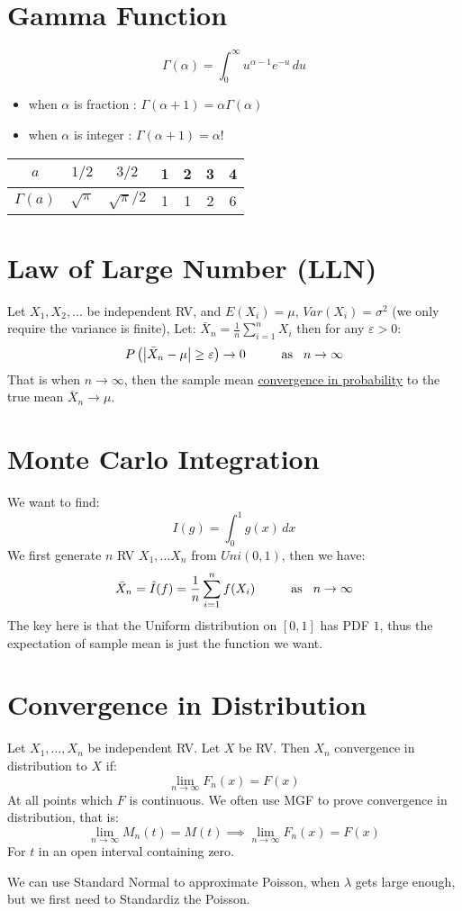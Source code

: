 \documentclass[12pt]{article}
\begin{document}
\begin{multicols*}{4}
    \section{Gamma Function}
    $$\Gamma(\alpha)=\int_0^\infty u^{\alpha-1}e^{-u}\,du$$
    \begin{itemize}[leftmargin=*]
        \item when $\alpha$ is fraction : $\Gamma(\alpha+1)=\alpha\Gamma(\alpha)$
        \item when $\alpha$ is integer : $\Gamma(\alpha+1)=\alpha!$
    \end{itemize}
    \begin{center}
        \begin{tabular}{ | c | c c c c c c |}
            \hline
            $a$         & $1/2$        & $3/2$          & 1 & 2 & 3 & 4 \\ \hline
            $\Gamma(a)$ & $\sqrt{\pi}$ & $\sqrt{\pi}/2$ & 1 & 1 & 2 & 6 \\ \hline
        \end{tabular}
    \end{center}
    \section{Law of Large Number (LLN)}
    Let $X_1, X_2, \dots$ be independent RV, and $E(X_i)=\mu$, $Var(X_i)=\sigma^2$ (we only require the variance is finite), Let:
    $\bar X_n=\frac{1}{n}\sum_{i=1}^nX_i$
    then for any $\varepsilon>0$:
    $$P\left(\left|\bar X_n-\mu\right|\geq\varepsilon\right)\to 0\hspace{1cm}\text{as}\hspace{0.3cm}n\to\infty$$
    That is when $n\to\infty$, then the sample mean \underline{convergence in probability} to the true mean $\bar X_n\to\mu$.
    \section{Monte Carlo Integration}
    We want to find:
    $$I(g)=\int_0^1 g(x)\,dx$$
    We first generate $n$ RV $X_1, \dots X_n$ from $Uni(0, 1)$, then we have:
    $$\bar X_n=\hat I(f)=\frac{1}{n}\sum_{i=1}^nf(X_i)\hspace{1cm}\text{as}\hspace{0.3cm}n\to\infty$$
    The key here is that the Uniform distribution on $[0, 1]$ has PDF $1$, thus the expectation of sample mean is just the function we want.
    \section{Convergence in Distribution}
    Let $X_1, \dots, X_n$ be independent RV. Let $X$ be RV. Then $X_n$ convergence in distribution to $X$ if:
    $$\lim_{n\to\infty}F_n(x)=F(x)$$
    At all points which $F$ is continuous. We often use MGF to prove convergence in distribution, that is:
    $$\lim_{n\to\infty}M_n(t)=M(t)\implies\lim_{n\to\infty}F_n(x)=F(x)$$
    For $t$ in an open interval containing zero.\par
    We can use Standard Normal to approximate Poisson, when $\lambda$ gets large enough, but we first need to Standardiz the Poisson.

\end{multicols*}
\end{document}
